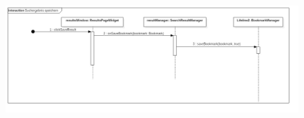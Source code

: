 \begin{figure}[H]
\centering
\includegraphics[width=\linewidth]{img/Sequenzdiagramme/SuchergebnisSpeichern}
\label{fig:suchergebnisSpeichern}
\end{figure}